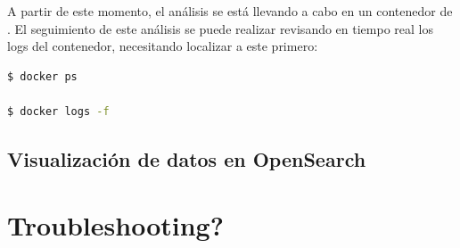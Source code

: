 A partir de este momento, el análisis se está llevando a cabo en un contenedor de . El seguimiento de este análisis se puede realizar revisando en tiempo real los logs del contenedor, necesitando localizar a este primero:

\begin{lstlisting}[language=bash]
$ docker ps

$ docker logs -f
\end{lstlisting}

\subsection{Visualización de datos en OpenSearch}

\section{Troubleshooting?}
